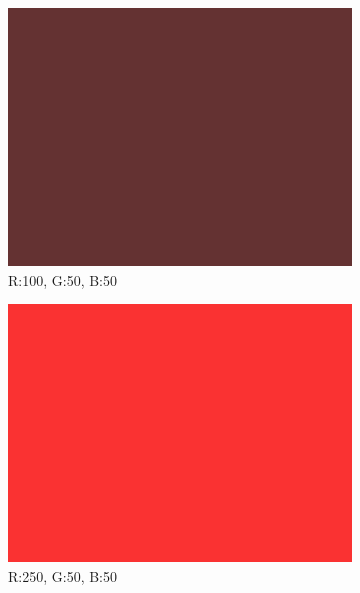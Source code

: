 \documentclass{ctuthesis}
\begin{document}
\begin{figure}[htbp]
     \centering
     \begin{subfigure}{0.3\textwidth}
         \centering
         \includegraphics[width=\textwidth]{100-50-50.png}
         \caption{R:100, G:50, B:50}
         \label{fig: rgb a}
     \end{subfigure}
     \hfill
     \begin{subfigure}{0.3\textwidth}
         \centering
         \includegraphics[width=\textwidth]{250-50-50.png}
         \caption{R:250, G:50, B:50}
         \label{fig: rgb b}
     \end{subfigure}
          \hfill
     \begin{subfigure}{0.3\textwidth}

\end{subfigure}
\end{figure}
\end{document}
